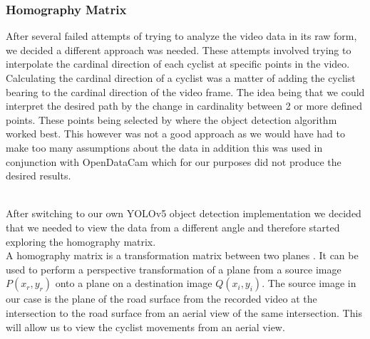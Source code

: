 \subsubsection{Homography Matrix}

After several failed attempts of trying to analyze the video data in its raw form, we decided a different approach was needed.
These attempts involved trying to interpolate the cardinal direction of each cyclist at specific points in the video. Calculating the cardinal direction
of a cyclist was a matter of adding the cyclist bearing to the cardinal direction of the video frame. The idea being that we could interpret
the desired path by the change in cardinality between 2 or more defined points. These points being selected by where the object detection algorithm worked best.
This however was not a good approach as we would have had to make too many assumptions about the data in addition this was used in conjunction
with OpenDataCam which for our purposes did not produce the desired results.

\ \\
After switching to our own YOLOv5 object detection implementation we decided that we needed to view the data from a different angle and therefore
started exploring the homography matrix.
\ \\
A homography matrix is a transformation matrix between two planes \cite{hartley_zisserman_2004}. It can be used to perform a perspective transformation of a plane from a source image $P(x_r, y_r)$ onto a plane on a destination image $Q(x_i, y_i)$.
The source image in our case is the plane of the road surface from the recorded video at the intersection to the road surface from an aerial view of the same intersection. 
This will allow us to view the cyclist movements from an aerial view.

